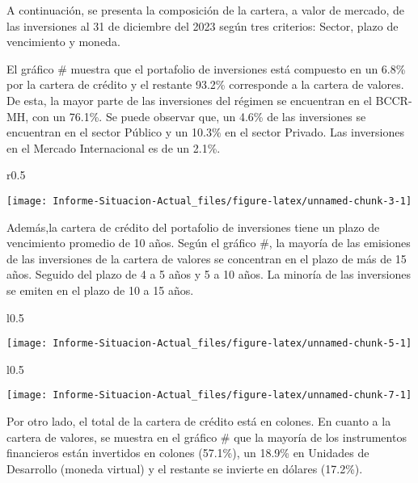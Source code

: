 \documentclass[
]{article}
\begin{document}
A continuación, se presenta la composición de la cartera, a valor de
mercado, de las inversiones al 31 de diciembre del 2023 según tres
criterios: Sector, plazo de vencimiento y moneda.

El gráfico \# muestra que el portafolio de inversiones está compuesto en
un 6.8\% por la cartera de crédito y el restante 93.2\% corresponde a la
cartera de valores. De esta, la mayor parte de las inversiones del
régimen se encuentran en el BCCR-MH, con un 76.1\%. Se puede observar
que, un 4.6\% de las inversiones se encuentran en el sector Público y un
10.3\% en el sector Privado. Las inversiones en el Mercado Internacional
es de un 2.1\%.

\begin{wrapfigure}[15]{r}{0.5\textwidth}

 \centering
 

\begin{flushright}\texttt{[image: Informe-Situacion-Actual\_files/figure-latex/unnamed-chunk-3-1]} \end{flushright}
\end{wrapfigure}

Además,la cartera de crédito del portafolio de inversiones tiene un
plazo de vencimiento promedio de 10 años. Según el gráfico \#, la
mayoría de las emisiones de las inversiones de la cartera de valores se
concentran en el plazo de más de 15 años. Seguido del plazo de 4 a 5
años y 5 a 10 años. La minoría de las inversiones se emiten en el plazo
de 10 a 15 años.

\begin{wrapfigure}[15]{l}{0.5\textwidth}

 \centering
 

\begin{flushleft}\texttt{[image: Informe-Situacion-Actual\_files/figure-latex/unnamed-chunk-5-1]} \end{flushleft}
\end{wrapfigure}

\begin{wrapfigure}[15]{l}{0.5\textwidth}

 \centering
 

\begin{flushleft}\texttt{[image: Informe-Situacion-Actual\_files/figure-latex/unnamed-chunk-7-1]} \end{flushleft}
\end{wrapfigure}

Por otro lado, el total de la cartera de crédito está en colones. En
cuanto a la cartera de valores, se muestra en el gráfico \# que la
mayoría de los instrumentos financieros están invertidos en colones
(57.1\%), un 18.9\% en Unidades de Desarrollo (moneda virtual) y el
restante se invierte en dólares (17.2\%).
\end{document}
